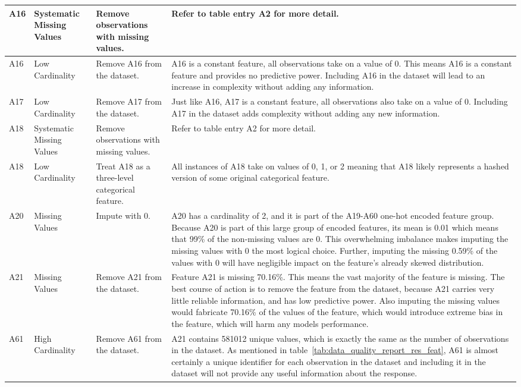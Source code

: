 \documentclass[11pt]{report}
\begin{document}
\begin{longtable}{p{2cm}p{3cm}p{4cm}p{6cm}}
\midrule
A16 & Systematic Missing Values & Remove observations with missing values. & Refer to table entry A2 for more detail. \\
\midrule
A16 & Low Cardinality & Remove A16 from the dataset. & A16 is a constant feature, all observations take on a value of 0. This means A16 is a constant feature and provides no predictive power. Including A16 in the dataset will lead to an increase in complexity without adding any information. \\
\midrule
A17 & Low Cardinality & Remove A17 from the dataset. & Just like A16, A17 is a constant feature, all observations also take on a value of 0. Including A17 in the dataset adds complexity without adding any new information. \\
\midrule
A18 & Systematic Missing Values & Remove observations with missing values. & Refer to table entry A2 for more detail. \\
\midrule
A18 & Low Cardinality & Treat A18 as a three-level categorical feature. & All instances of A18 take on values of 0, 1, or 2 meaning that A18 likely represents a hashed version of some original categorical feature. \\
\midrule
A20 & Missing Values & Impute with 0. & A20 has a cardinality of 2, and it is part of the A19-A60 one-hot encoded feature group. Because A20 is part of this large group of encoded features, its mean is 0.01 which means that 99\% of the non-missing values are 0. This overwhelming imbalance makes imputing the missing values with 0 the most logical choice. Further, imputing the missing 0.59\% of the values with 0 will have negligible impact on the feature's already skewed distribution. \\
\midrule
A21 & Missing Values & Remove A21 from the dataset. & Feature A21 is missing 70.16\%. This means the vast majority of the feature is missing. The best course of action is to remove the feature from the dataset, because A21 carries very little reliable information, and has low predictive power. Also imputing the missing values would fabricate 70.16\% of the values of the feature, which would introduce extreme bias in the feature, which will harm any models performance. \\
\midrule
A61 & High Cardinality & Remove A61 from the dataset. & A21 contains 581012 unique values, which is exactly the same as the number of observations in the dataset. As mentioned in table~\ref{tab:data_quality_report_res_feat}, A61 is almost certainly a unique identifier for each observation in the dataset and including it in the dataset will not provide any useful information about the response. \\

\end{longtable}
\end{document}
